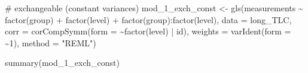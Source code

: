 \documentclass[
  letterpaper,
  DIV=11,
  numbers=noendperiod]{scrreprt}
\newenvironment{Shaded}{\begin{snugshade}}{\end{snugshade}}
\newcommand{\AttributeTok}[1]{\textcolor[rgb]{0.40,0.45,0.13}{#1}}
\newcommand{\CommentTok}[1]{\textcolor[rgb]{0.37,0.37,0.37}{#1}}
\newcommand{\DecValTok}[1]{\textcolor[rgb]{0.68,0.00,0.00}{#1}}
\newcommand{\FunctionTok}[1]{\textcolor[rgb]{0.28,0.35,0.67}{#1}}
\newcommand{\NormalTok}[1]{\textcolor[rgb]{0.00,0.23,0.31}{#1}}
\newcommand{\OtherTok}[1]{\textcolor[rgb]{0.00,0.23,0.31}{#1}}
\newcommand{\SpecialCharTok}[1]{\textcolor[rgb]{0.37,0.37,0.37}{#1}}
\newcommand{\StringTok}[1]{\textcolor[rgb]{0.13,0.47,0.30}{#1}}
\begin{document}
\begin{Shaded}
\begin{Highlighting}[]
\CommentTok{\# exchangeable (constant variances)}
\NormalTok{mod\_1\_exch\_const }\OtherTok{\textless{}{-}} \FunctionTok{gls}\NormalTok{(measurements }\SpecialCharTok{\textasciitilde{}} \FunctionTok{factor}\NormalTok{(group) }\SpecialCharTok{+} \FunctionTok{factor}\NormalTok{(level) }\SpecialCharTok{+} \FunctionTok{factor}\NormalTok{(group)}\SpecialCharTok{:}\FunctionTok{factor}\NormalTok{(level),}
    \AttributeTok{data =}\NormalTok{ long\_TLC, }\AttributeTok{corr =} \FunctionTok{corCompSymm}\NormalTok{(}\AttributeTok{form =} \SpecialCharTok{\textasciitilde{}}\FunctionTok{factor}\NormalTok{(level) }\SpecialCharTok{|}\NormalTok{ id), }\AttributeTok{weights =} \FunctionTok{varIdent}\NormalTok{(}\AttributeTok{form =} \SpecialCharTok{\textasciitilde{}}\DecValTok{1}\NormalTok{),}
    \AttributeTok{method =} \StringTok{"REML"}\NormalTok{)}

\FunctionTok{summary}\NormalTok{(mod\_1\_exch\_const)}
\end{Highlighting}
\end{Shaded}
\end{document}
